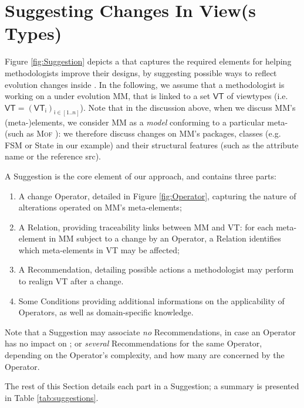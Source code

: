 \section{Suggesting Changes In View(s Types)}
\label{sec:Suggestion}

Figure \ref{fig:Suggestion} depicts a \metamodel that captures the
required elements for helping methodologists improve their \viewtype designs,
by suggesting possible ways to reflect evolution changes inside \viewtypes.
In the following, we assume that a methodologist is working on a \metamodel
under evolution \textsf{MM}, that is linked to a set $\mathsf{VT}$ of viewtypes
(i.e. $\mathsf{VT} = (\mathsf{VT}_\mathsf{i})_{\mathsf{i}\in [1..n]}$). Note that in the discussion above, when we discuss
\textsf{MM}'s (meta-)elements, we consider \textsf{MM} as a \emph{model}
conforming to a particular meta-\metamodel (such as \textsc{Mof} \cite{TR:OMG-MOF:2016}):
we therefore discuss changes on \textsf{MM}'s packages, classes (e.g. 
\textsf{FSM} or \textsf{State} in our example) and their structural features
(such as the attribute \textsf{name} or the reference \textsf{src}).

A \textsf{Suggestion} is the core element of our approach, and contains three 
parts:
\begin{enumerate}
    \item A change \textsf{Operator}, detailed in Figure \ref{fig:Operator}, capturing the nature of
alterations operated on \textsf{MM}'s meta-elements; 
    \item A \textsf{Relation}, providing traceability links between \textsf{MM} 
		and \textsf{VT}: for each meta-element in \textsf{MM} subject to a 
		change by an \textsf{Operator}, a \textsf{Relation} identifies which 
		meta-elements in \textsf{VT} may be affected;
    \item A \textsf{Recommendation}, detailing possible actions a methodologist 
		may perform to realign \textsf{VT} after a change. 
		\item Some \textsf{Condition}s providing additional informations on the
		applicability of \textsf{Operator}s, as well as domain-specific knowledge.
\end{enumerate}

Note that a \textsf{Suggestion} may 
associate \emph{no} \textsf{Recommendation}s, in case an \textsf{Operator} has no
impact on \viewtypes; or \emph{several} \textsf{Recommendation}s for the same 
\textsf{Operator}, depending on the \textsf{Operator}'s complexity, and how 
many \viewtypes are concerned by the \textsf{Operator}.

The rest of this Section details each part in a \textsf{Suggestion}; a summary
is presented in Table \ref{tab:suggestions}.






